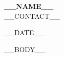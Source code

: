 \documentclass[a4paper,11pt]{article}
\begin{document}
{\Large \textbf{__NAME__}}\\
__CONTACT__

\vspace{1.5em}

__DATE__

\vspace{1em}

__BODY__
\end{document}
